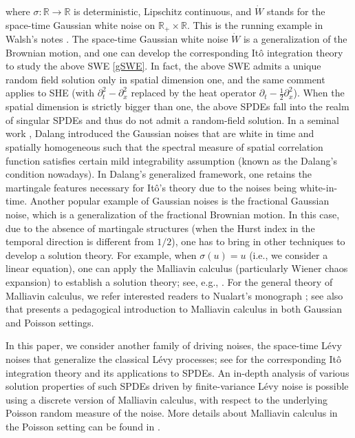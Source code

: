 \documentclass[letterpaper, 11pt,  reqno]{amsart}
\newcommand{\noi}{\noindent}
\newcommand{\R}{\mathbb{R}}
\newcommand{\s}{\sigma}
\newcommand{\dx}{\partial_x}
\newcommand{\dt}{\partial_t}
\numberwithin{equation}{section}
\numberwithin{theorem}{section}
\begin{document}
\noi
where $\s: \R\to\R$ is  deterministic, Lipschitz continuous,
and $\dot{W}$ stands for the space-time Gaussian white noise on $\R_+\times\R$.
This is the running example in Walsh's notes \cite{walsh86}. 
The space-time Gaussian white noise $\dot{W}$  is a generalization of the Brownian motion,
and one can develop the corresponding It\^o integration theory to study
the above SWE \eqref{gSWE}. In fact,  the above SWE admits a unique   random field solution 
only in spatial dimension one, and the same comment applies 
to SHE (with $\dt^2 - \dx^2$ replaced by the heat operator 
$\dt - \frac{1}{2}\dx^2$). When the spatial dimension is strictly bigger than one, 
the above SPDEs fall into the realm of singular SPDEs and thus do not
admit a random-field solution.
In a seminal   work \cite{dalang99},
Dalang introduced the
 Gaussian noises  that are white in time and spatially homogeneous 
 such that  the spectral measure of spatial correlation function satisfies 
 certain mild integrability assumption (known as the Dalang's condition nowadays).
In Dalang's generalized framework, one retains the martingale features
necessary for It\^o's theory due to the noises being white-in-time.
Another popular example of Gaussian noises
 is the fractional Gaussian noise, which is a generalization of the fractional Brownian motion. 
In this case, due to the absence of martingale structures (when the Hurst index in the 
temporal direction
is different from $1/2$), one has to bring in other techniques to develop a solution  theory.
For example, when $\s(u)=u$ (i.e., we consider a linear equation),
one can apply the Malliavin calculus (particularly Wiener chaos expansion)
to establish a solution theory; see, e.g., \cite{HHNT15, BS17}.
For the general theory of  Malliavin calculus, we refer interested readers
to  Nualart's monograph \cite{Nua06};
see also  \cite{NN18} that presents 
 a pedagogical introduction to Malliavin calculus in  both Gaussian and Poisson settings.
 
 In this paper, we consider another family of driving noises,
 the space-time  L\'evy noises that generalize the classical  L\'evy processes;
 see \cite{B15} for the corresponding 
 It\^o integration theory and its applications to SPDEs. 
An in-depth analysis of various  solution properties  of such 
SPDEs driven by finite-variance L\'evy noise is possible using a discrete version of Malliavin calculus, with respect to the underlying Poisson random measure of the noise. More details about Malliavin calculus in the Poisson setting can be found in   \cite{Last16,LPS16,LP18,PSTU10}.
\end{document}

